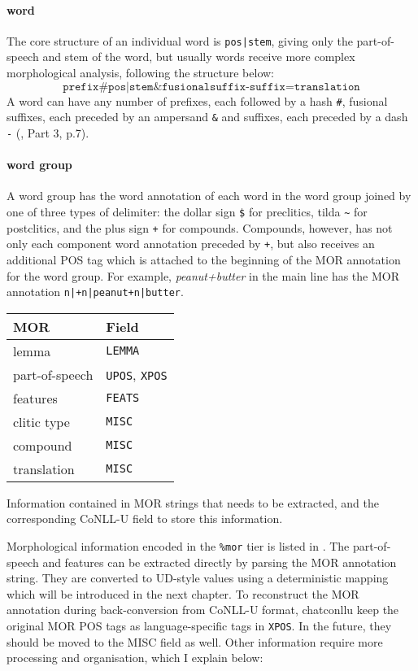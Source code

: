 \paragraph{word}
The core structure of an individual word is \texttt{pos|stem}, giving only the part-of-speech and stem of the word, but usually words receive more complex morphological analysis, following the structure below:
$$\texttt{prefix\#pos|stem\&fusionalsuffix-suffix=translation}$$
A word can have any number of prefixes, each followed by a hash \texttt{\#}, fusional suffixes, each preceded by an ampersand \texttt{\&} and suffixes, each preceded by a dash \texttt{-} (\cite{Macwhinney2000}, Part 3, p.7).

\paragraph{word group}
A word group has the word annotation of each word in the word group joined by one of three types of delimiter: the dollar sign \texttt{\$} for preclitics, tilda \texttt{\~{}} for postclitics, and the plus sign \texttt{+} for compounds. Compounds, however, has not only each component word annotation preceded by \texttt{+}, but also receives an additional POS tag which is attached to the beginning of the MOR annotation for the word group. For example, \emph{peanut+butter} in the main line has the MOR annotation \texttt{n|+n|peanut+n|butter}.

\begin{margintable}[1\baselineskip]
\begin{tabularx}{1\textwidth}{@{}ll@{}}
\toprule
\textbf{MOR} & \textbf{Field}\\\midrule
lemma & \texttt{LEMMA} \\
part-of-speech & \texttt{UPOS}, \texttt{XPOS}\\
features & \texttt{FEATS} \\\addlinespace
clitic type & \texttt{MISC} \\
compound & \texttt{MISC} \\
translation & \texttt{MISC} \\\bottomrule
\end{tabularx}
\caption{\label{tab:martabmor}Information contained in MOR strings that needs to be extracted, and the corresponding CoNLL-U field to store this information.}
\footnotesize
\end{margintable}

Morphological information encoded in the \texttt{\%mor} tier is listed in . The part-of-speech and features can be extracted directly by parsing the MOR annotation string. They are converted to UD-style values using a deterministic mapping which will be introduced in the next chapter. To reconstruct the MOR annotation during back-conversion from CoNLL-U format, chatconllu keep the original MOR POS tags as language-specific tags in \texttt{XPOS}. In the future, they should be moved to the MISC field as well. Other information require more processing and organisation, which I explain below:


